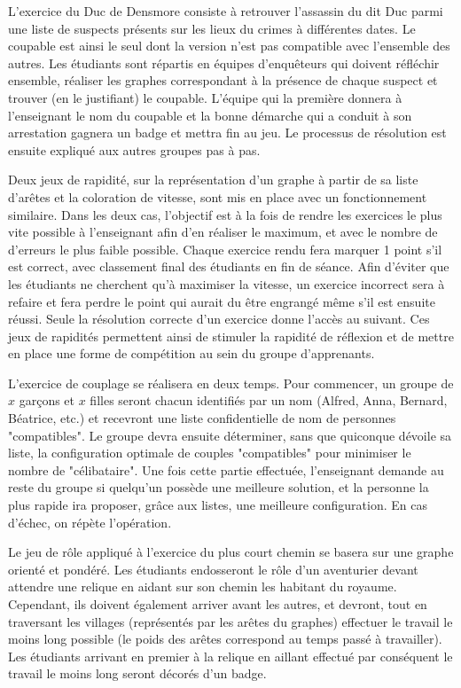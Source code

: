L'exercice du Duc de Densmore consiste à retrouver l'assassin du dit Duc parmi une liste de suspects présents sur les lieux du crimes à différentes dates. Le coupable est ainsi le seul dont la version n'est pas compatible avec l'ensemble des autres. Les étudiants sont répartis en équipes d'enquêteurs qui doivent réfléchir ensemble, réaliser les graphes correspondant à la présence de chaque suspect et trouver (en le justifiant) le coupable. L'équipe qui la première donnera à l'enseignant le nom du coupable et la bonne démarche qui a conduit à son arrestation gagnera un badge et mettra fin au jeu. Le processus de résolution est ensuite expliqué aux autres groupes pas à pas. \par
Deux jeux de rapidité, sur la représentation d'un graphe à partir de sa liste d'arêtes et la coloration de vitesse, sont mis en place avec un fonctionnement similaire. Dans les deux cas, l'objectif est à la fois de rendre les exercices le plus vite possible à l'enseignant afin d'en réaliser le maximum, et avec le nombre de d'erreurs le plus faible possible. Chaque exercice rendu fera marquer 1 point s'il est correct, avec classement final des étudiants en fin de séance. Afin d'éviter que les étudiants ne cherchent qu'à maximiser la vitesse, un exercice incorrect sera à refaire et fera perdre le point qui aurait du être engrangé même s'il est ensuite réussi. Seule la résolution correcte d'un exercice donne l'accès au suivant. Ces jeux de rapidités permettent ainsi de stimuler la rapidité de réflexion et de mettre en place une forme de compétition au sein du groupe d'apprenants. \par
L'exercice de couplage se réalisera en deux temps. Pour commencer, un groupe de $x$ garçons et $x$ filles seront chacun identifiés par un nom (Alfred, Anna, Bernard, Béatrice, etc.) et recevront une liste confidentielle de nom de personnes "compatibles". Le groupe devra ensuite déterminer, sans que quiconque dévoile sa liste, la configuration optimale de couples "compatibles" pour minimiser le nombre de "célibataire". Une fois cette partie effectuée, l'enseignant demande au reste du groupe si quelqu'un possède une meilleure solution, et la personne la plus rapide ira proposer, grâce aux listes, une meilleure configuration. En cas d'échec, on répète l'opération. \par
Le jeu de rôle appliqué à l'exercice du plus court chemin se basera sur une graphe orienté et pondéré. Les étudiants endosseront le rôle d'un aventurier devant attendre une relique en aidant sur son chemin les habitant du royaume. Cependant, ils doivent également arriver avant les autres, et devront, tout en traversant les villages (représentés par les arêtes du graphes) effectuer le travail le moins long possible (le poids des arêtes correspond au temps passé à travailler). Les étudiants arrivant en premier à la relique en aillant effectué par conséquent le travail le moins long seront décorés d'un badge. \par
